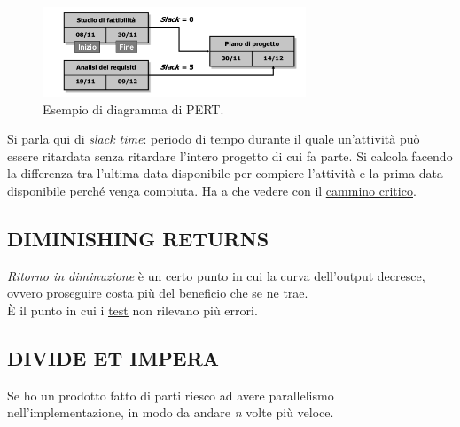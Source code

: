 		\begin{figure}[H]
			\centering
			\includegraphics[width=0.7\textwidth]{img/pert}
			\caption{Esempio di diagramma di PERT.}
		\end{figure}

		Si parla qui di \textit{slack time}: periodo di tempo durante il quale un'attività può essere ritardata senza ritardare l'intero progetto di cui fa parte. Si calcola facendo la differenza tra l'ultima data disponibile per compiere l'attività e la prima data disponibile perché venga compiuta. Ha a che vedere con il \underline{\hyperref[camminocritico]{cammino critico}}.

		\subsection{DIMINISHING RETURNS}		\label{diminishingreturn}	%
		\textit{Ritorno in diminuzione} è un certo punto in cui la curva dell'output decresce, ovvero proseguire costa più del beneficio che se ne trae. \\
		È il punto in cui i \underline{\hyperref[test]{test}} non rilevano più errori.

		\subsection{DIVIDE ET IMPERA}	 \label{divideetimpera}
		Se ho un prodotto fatto di parti riesco ad avere parallelismo nell'implementazione, in modo da andare \textit{n} volte più veloce.


